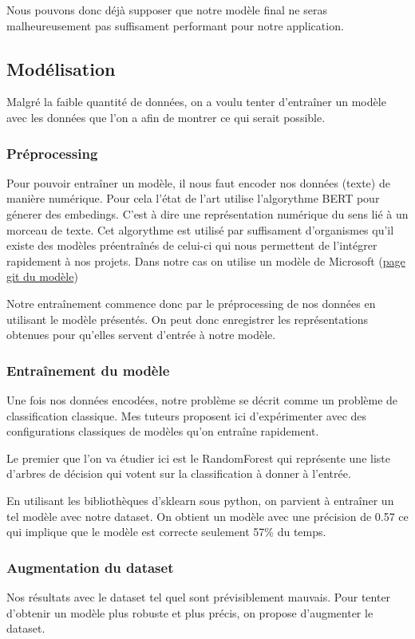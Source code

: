 \documentclass[oneside,a4paper,12pt]{article}
\begin{document}
	Nous pouvons donc déjà supposer que notre modèle final ne seras malheureusement pas suffisament performant pour notre application.
	 
	 
	\subsection{Modélisation}
	\label{training}
	
	Malgré la faible quantité de données, on a voulu tenter d'entraîner un modèle avec les données que l'on a afin de montrer ce qui serait possible.
	
	\subsubsection{Préprocessing}
	\label{preprocessing}
	Pour pouvoir entraîner un modèle, il nous faut encoder nos données (texte) de manière numérique. Pour cela l'état de l'art utilise l'algorythme BERT pour génerer des embedings. C'est à dire une représentation numérique du sens lié à un morceau de texte. Cet algorythme est utilisé par suffisament d'organismes qu'il existe des modèles préentraînés de celui-ci qui nous permettent de l'intégrer rapidement à nos projets. Dans notre cas on utilise un modèle de Microsoft (\href{https://github.com/microsoft/CodeBERT}{page git du modèle})
	
	Notre entraînement commence donc par le préprocessing de nos données en utilisant le modèle présentés. On peut donc enregistrer les représentations obtenues pour qu'elles servent d'entrée à notre modèle.
	
	\subsubsection{Entraînement du modèle}
	Une fois nos données encodées, notre problème se décrit comme un problème de classification classique. Mes tuteurs proposent ici d'expérimenter avec des configurations classiques de modèles qu'on entraîne rapidement.
	
	Le premier que l'on va étudier ici est le RandomForest qui représente une liste d'arbres de décision qui votent sur la classification à donner à l'entrée.
	
	En utilisant les bibliothèques d'sklearn sous python, on parvient à entraîner un tel modèle avec notre dataset.
	On obtient un modèle avec une précision de 0.57 ce qui implique que le modèle est correcte seulement 57\% du temps.
	
	\subsubsection{Augmentation du dataset}
	\label{trainingFinal}
	Nos résultats avec le dataset tel quel sont prévisiblement mauvais. Pour tenter d'obtenir un modèle plus robuste et plus précis, on propose d'augmenter le dataset.
	
\end{document}
